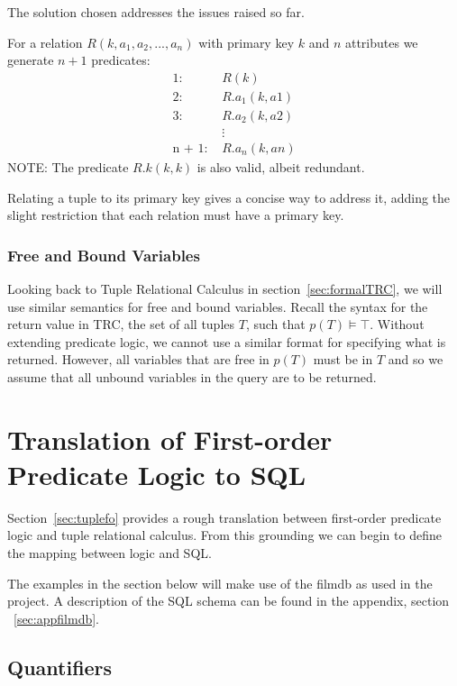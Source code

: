 \documentclass[a4paper, 11pt]{article}
\begin{document}
      The solution chosen addresses the issues raised so far.

      For a relation $R(k, a_{1}, a_{2}, ..., a_{n})$ with primary key $k$
      and $n$ attributes we generate $n + 1$ predicates:
      \begin{align*}
        \text{1:  }      & R(k)           \\
        \text{2:  }      & R.a_1(k, a1)   \\
        \text{3:  }      & R.a_2(k, a2)   \\
                         & \vdots         \\
        \text{n + 1:  }  & R.a_n(k, an)
      \end{align*}
      NOTE: The predicate $R.k(k, k)$ is also valid, albeit redundant.

      Relating a tuple to its primary key gives a concise way to address it,
      adding the slight restriction that each relation must have a primary key.

    \subsubsection{Free and Bound Variables}
      \label{sec:freebound}
      Looking back to Tuple Relational Calculus in section~\ref{sec:formalTRC},
      we will use similar semantics for free and bound variables. Recall the
      syntax for the return value in TRC, the set of all tuples $T$, such that
      $p(T) \models \top$. Without extending predicate logic, we cannot use a
      similar format for specifying what is returned. However, all variables
      that are free in $p(T)$ must be in $T$ and so we assume that all unbound
      variables in the query are to be returned.

\section{Translation of First-order Predicate Logic to SQL}
  Section~\ref{sec:tuplefo} provides a rough translation between first-order
  predicate logic and tuple relational calculus. From this grounding we can
  begin to define the mapping between logic and SQL.

  The examples in the section below will make use of the filmdb as used in the
  project. A description of the SQL schema can be found in the appendix,
  section ~\ref{sec:appfilmdb}.

  \subsection{Quantifiers}
\end{document}
